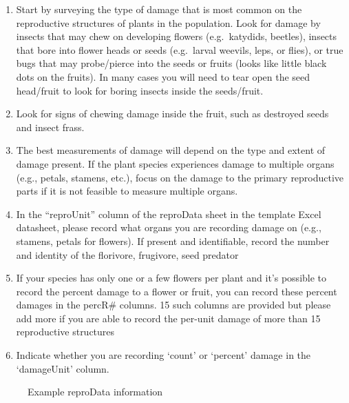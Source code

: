 \documentclass[
  letterpaper,
  oneside,
  open=any]{scrbook}
\begin{document}
\begin{enumerate}
\def\labelenumi{\arabic{enumi}.}
\item
  Start by surveying the type of damage that is most common on the
  reproductive structures of plants in the population. Look for damage
  by insects that may chew on developing flowers (e.g.~katydids,
  beetles), insects that bore into flower heads or seeds (e.g.~larval
  weevils, leps, or flies), or true bugs that may probe/pierce into the
  seeds or fruits (looks like little black dots on the fruits). In many
  cases you will need to tear open the seed head/fruit to look for
  boring insects inside the seeds/fruit.
\item
  Look for signs of chewing damage inside the fruit, such as destroyed
  seeds and insect frass.
\item
  The best measurements of damage will depend on the type and extent of
  damage present. If the plant species experiences damage to multiple
  organs (e.g., petals, stamens, etc.), focus on the damage to the
  primary reproductive parts if it is not feasible to measure multiple
  organs.
\item
  In the ``reproUnit'' column of the reproData sheet in the template
  Excel datasheet, please record what organs you are recording damage on
  (e.g., stamens, petals for flowers). If present and identifiable,
  record the number and identity of the florivore, frugivore, seed
  predator
\item
  If your species has only one or a few flowers per plant and it's
  possible to record the percent damage to a flower or fruit, you can
  record these percent damages in the percR\# columns. 15 such columns
  are provided but please add more if you are able to record the
  per-unit damage of more than 15 reproductive structures
\item
  Indicate whether you are recording `count' or `percent' damage in the
  `damageUnit' column.
\end{enumerate}

\begin{figure}


\caption{\label{fig-reprotable}Example reproData information}

\end{figure}%
\end{document}
